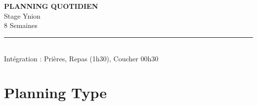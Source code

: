 \documentclass[12pt,a4paper]{article}
\begin{document}
\begin{titlepage}
    \centering
    \vspace*{3cm}
    {\Huge \textbf{PLANNING QUOTIDIEN}}\\[0.5cm]
    {\Large Stage Ynion}\\[0.3cm]
    {\large 8 Semaines}\\[1.5cm]
    \rule{0.6\textwidth}{0.5pt}\\[0.5cm]
    \vfill
    {\small Intégration : Prières, Repas (1h30), Coucher 00h30}
\end{titlepage}

\newpage

\section*{Planning Type}
\end{document}
